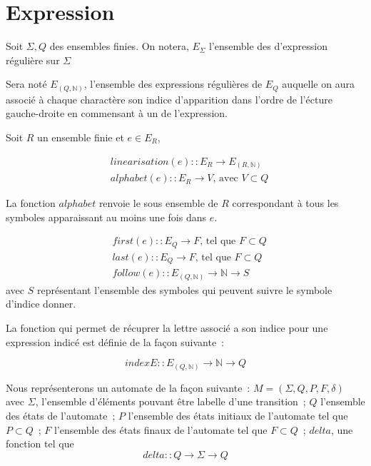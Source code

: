 \documentclass{article}
\begin{document}
\section{Expression}

Soit \(\Sigma, Q\) des ensembles finies. On notera, \(E_{\Sigma}\) l'ensemble 
des d'expression régulière sur \(\Sigma\)

Sera noté \(E_{(Q, \mathbb{N})}\), l'ensemble des expressions régulières de 
\(E_Q\) auquelle on aura associé à chaque charactère son indice d'apparition 
dans l'ordre de l'écture gauche-droite en commensant à un de l'expression.

Soit \(R\) un ensemble finie et \(e \in E_R\),

\begin{equation*}
  \begin{split}
  & linearisation(e) :: E_R \to E_{(R, \mathbb{N})} \\
  & alphabet(e) :: E_R \to V \text{, avec } V \subset Q
  \end{split}
\end{equation*}

La fonction \(alphabet\) renvoie le sous ensemble de \(R\) correspondant à tous 
les symboles apparaissant au moins une fois dans \(e\).

\begin{equation*}
  \begin{split}
  & first(e) :: E_Q \to F \text{, tel que } F \subset Q \\
  & last(e) :: E_Q \to F \text{, tel que } F \subset Q \\
  & follow(e) :: E_{(Q, \mathbb{N})} \to \mathbb{N} \to S 
  \end{split}
\end{equation*}
avec \(S\) représentant l'ensemble des symboles qui peuvent suivre le symbole 
d'indice donner.

La fonction qui permet de récuprer la lettre associé a son indice pour une 
expression indicé est définie de la façon suivante~:

\[
indexE :: E_{(Q, \mathbb{N})} \to \mathbb{N} \to Q
\]

Nous représenterons un automate de la façon suivante~: 
\(M = (\Sigma, Q, P, F, \delta)\) avec \(\Sigma\), l'ensemble d'éléments pouvant 
être labelle d'une transition~; 
\(Q\) l'ensemble des états de l'automate~; 
\(P\) l'ensemble des états initiaux de l'automate tel que \(P \subset Q\)~; 
\(F\) l'ensemble des états finaux de l'automate tel que \(F \subset Q\)~; 
\(delta\), une fonction tel que
\[
  delta :: Q \to \Sigma \to Q
\]
\end{document}

